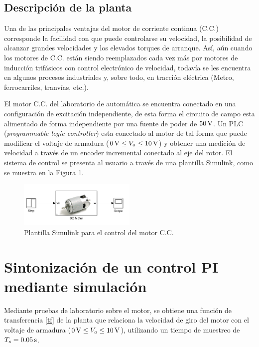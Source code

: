 \documentclass[11pt,letterpaper,notitlepage]{article}
\begin{document}
\subsection{Descripción de la planta}

Una de las principales ventajas del motor de corriente continua (C.C.) corresponde la facilidad con que puede controlarse su velocidad, la posibilidad de alcanzar grandes velocidades y los elevados torques de arranque. Así, aún cuando los motores de C.C. están siendo reemplazados cada vez más por motores de inducción trifásicos con control electrónico de velocidad, todavía se les encuentra en algunos procesos industriales y, sobre todo, en tracción eléctrica (Metro, ferrocarriles, tranvías, etc.).

El motor C.C. del laboratorio de automática se encuentra conectado en una configuración de excitación independiente, de esta forma el circuito de campo esta alimentado de forma independiente por una fuente de poder de $50 \,\mbox{\si{\volt}}$. Un PLC (\textit{programmable logic controller}) esta conectado al motor de tal forma que puede modificar el voltaje de armadura ($0 \, \mbox{\si{V}} \leq V_a \leq 10 \, \mbox{\si{V}}$) y obtener una medición de velocidad a través de un encoder incremental conectado al eje del rotor. El sistema de control se presenta al usuario a través de una plantilla Simulink, como se muestra en la Figura \ref{esquema-planta}.

\begin{figure}[H]
\begin{center}
	\includegraphics[width=0.5\textwidth]{planta}
	\caption{Plantilla Simulink para el control del motor C.C.}
	\label{esquema-planta}
\end{center}
\end{figure}


\section{Sintonización de un control PI mediante simulación}

Mediante pruebas de laboratorio sobre el motor, se obtiene una función de transferencia \ref{tf} de la planta que relaciona la velocidad de giro del motor con el voltaje de armadura ($0 \, \mbox{\si{V}} \leq V_a \leq 10 \, \mbox{\si{V}}$), utilizando un tiempo de muestreo de $T_s = 0.05 \,\mbox{\si{s}}$.
\end{document}
